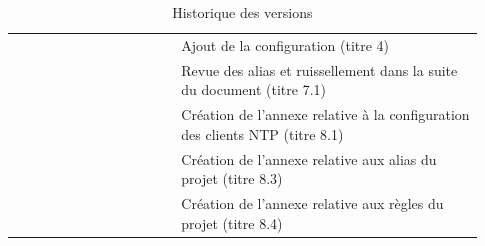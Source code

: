 \documentclass[a4paper, oneside, 12pt, final, headsepline, footsepline]{scrartcl}
\begin{document}
\begin{table}[H]
\begin{tabular}{|>{\centering\arraybackslash}p{0.09\linewidth}|>{\centering\arraybackslash}p{0.12\linewidth}|>{\raggedright\arraybackslash}p{0.12\linewidth}|>{\raggedright\arraybackslash}p{0.6\linewidth}|}
                         &               &                 & Ajout de la configuration (titre 4)                                            \\
                         &               &                 & Revue des alias et ruissellement dans la suite du document (titre 7.1)         \\
                         &               &                 & Création de l'annexe relative à la configuration des clients NTP (titre 8.1)   \\
                         &               &                 & Création de l'annexe relative aux alias du projet (titre 8.3)                  \\
                         &               &                 & Création de l'annexe relative aux règles du projet (titre 8.4)                 \\ \hline
    \end{tabular}
    \caption{Historique des versions}
    \label{tab:versioning}
\end{table}

\newpage
\tableofcontents
\newpage


\newpage

\newpage

\end{document}
